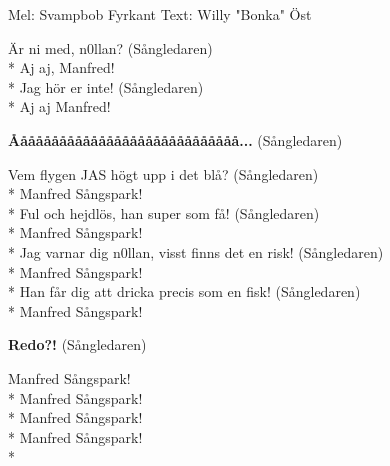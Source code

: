 \begin{SongText}
    \begin{SongInfo}
        Mel: Svampbob Fyrkant
        Text: Willy "Bonka" Öst
    \end{SongInfo}
    \begin{SongVerse}
        Är ni med, n0llan? (Sångledaren)\\*%
        Aj aj, Manfred!\\*%
        Jag hör er inte! (Sångledaren)\\*%
        Aj aj Manfred!
    \end{SongVerse}
    \begin{SongVerse}
        \textbf{Ååååååååååååååååååååååååååååå...} (Sångledaren)
    \end{SongVerse}
    \begin{SongVerse}
        Vem flygen JAS högt upp i det blå? (Sångledaren)\\*%
        Manfred Sångspark!\\*%
        Ful och hejdlös, han super som få! (Sångledaren)\\*%
        Manfred Sångspark!\\*%
        Jag varnar dig n0llan, visst finns det en risk! (Sångledaren)\\*%
        Manfred Sångspark!\\*%
        Han får dig att dricka precis som en fisk! (Sångledaren)\\*%
        Manfred Sångspark!
    \end{SongVerse}
    \begin{SongVerse}
        \textbf{Redo?!} (Sångledaren)
    \end{SongVerse}
    \begin{SongVerse}
        Manfred Sångspark!\\*%
        Manfred Sångspark!\\*%
        Manfred Sångspark!\\*%
        Manfred Sångspark!\\*%
    \end{SongVerse}
\end{SongText}
